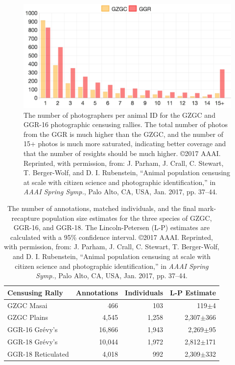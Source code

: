 \begin{figure}[!t]
    \begin{center}
        \includegraphics[width=0.8\linewidth]{resources/sightings-histogram-linear-event-15.pdf}
    \end{center}
    \caption{The number of photographers per animal ID for the GZGC and GGR-16 photographic censusing rallies.  The total number of photos from the GGR is much higher than the GZGC, and the number of 15+ photos is much more saturated, indicating better coverage and that the number of resights should be much higher.  \copyright 2017 AAAI. Reprinted, with permission, from: J. Parham, J. Crall, C. Stewart, T. Berger-Wolf, and D. I. Rubenstein, ``Animal population censusing at scale with citizen science and photographic identification,'' in \textit{AAAI Spring Symp.}, Palo Alto, CA, USA, Jan. 2017, pp. 37–44.}
    \label{fig:photographs}
\end{figure}

\begin{table}[!t]
    \caption{The number of annotations, matched individuals, and the final mark-recapture population size estimates for the three species of GZGC, GGR-16, and GGR-18.  The Lincoln-Petersen (L-P) estimates are calculated with a 95\% confidence interval.  \copyright 2017 AAAI. Reprinted, with permission, from: J. Parham, J. Crall, C. Stewart, T. Berger-Wolf, and D. I. Rubenstein, ``Animal population censusing at scale with citizen science and photographic identification,'' in \textit{AAAI Spring Symp.}, Palo Alto, CA, USA, Jan. 2017, pp. 37–44.}
    \label{table:stats}
    \begin{center}
        \begin{tabular}{| l | r | r | r |}
            \hline
            Censusing Rally    & Annotations & Individuals & L-P Estimate  \\
            \hline
            GZGC Masai         & 466         & 103         & 119$\pm$4     \\
            \hline
            GZGC Plains        & 4,545       & 1,258       & 2,307$\pm$366 \\
            \hline
            GGR-16 Gr\'evy's   & 16,866      & 1,943       & 2,269$\pm$95  \\
            \hline
            GGR-18 Gr\'evy's   & 10,044      & 1,972       & 2,812$\pm$171 \\
            \hline
            GGR-18 Reticulated & 4,018       & 992         & 2,309$\pm$332 \\
            \hline
        \end{tabular}
    \end{center}
\end{table}

